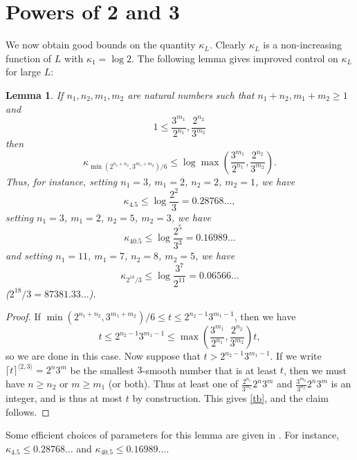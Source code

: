 \documentclass[12pt,a4paper,reqno]{amsart}
\numberwithin{equation}{section}
\theoremstyle{plain}
\newtheorem{lemma}[theorem]{Lemma}
\theoremstyle{definition}
\begin{document}
\section{Powers of 2 and 3}\label{power-sec}

We now obtain good bounds on the quantity $\kappa_L$.  Clearly $\kappa_L$ is a non-increasing function of $L$ with $\kappa_1 = \log 2$.  The following lemma gives improved control on $\kappa_L$ for large $L$:

\begin{lemma}\label{lemcount-0}  If $n_1,n_2,m_1,m_2$ are natural numbers such that $n_1+n_2, m_1+m_2 \geq 1$ and
$$ 1 \leq \frac{3^{m_1}}{2^{n_1}}, \frac{2^{n_2}}{3^{m_2}}$$
then
$$ \kappa_{\min( 2^{n_1+n_2},3^{m_1+m_2})/6} \leq \log \max\left(\frac{3^{m_1}}{2^{n_1}}, \frac{2^{n_2}}{3^{m_2}}\right).$$
Thus, for instance, setting $n_1=3$, $m_1=2$, $n_2=2$, $m_2=1$, we have
$$ \kappa_{4.5} \leq \log \frac{2^2}{3} = 0.28768\dots,$$
setting $n_1 = 3$, $m_1 = 2$, $n_2 = 5$, $m_2 = 3$, we have
$$\kappa_{40.5} \leq \log \frac{2^5}{3^3} = 0.16989\dots$$ 
and setting $n_1 = 11$, $m_1 = 7$, $n_2 = 8$, $m_2 = 5$, we have 
$$\kappa_{2^{18}/3} \leq \log \frac{3^7}{2^{11}} = 0.06566\dots$$
($2^{18}/3 = 87381.33\dots$).
\end{lemma}

\begin{proof}  If $\min( 2^{n_1+n_2},3^{m_1+m_2})/6 \leq t \leq 2^{n_2-1} 3^{m_1-1}$, then we have
\begin{equation}\label{tb} 
  t \leq 2^{n_2-1} 3^{m_1-1} \leq \max\left(\frac{3^{m_1}}{2^{n_1}}, \frac{2^{n_2}}{3^{m_2}}\right) t,
\end{equation}
so we are done in this case.  Now suppose that $t > 2^{n_2-1} 3^{m_1-1}$.
If we write $\lceil t \rceil^{\langle 2,3 \rangle} =2^n 3^m$ be the smallest $3$-smooth number that is at least $t$, then we must have $n \geq n_2$ or $m \geq m_1$ (or both).  Thus at least one of $\frac{2^{n_1}}{3^{m_1}} 2^n 3^m$ and $\frac{3^{m_2}}{3^{n_2}} 2^n 3^m$ is an integer, and is thus at most $t$ by construction.  This gives \eqref{tb}, and the claim follows.
\end{proof}

Some efficient choices of parameters for this lemma are given in .  For instance, $\kappa_{4.5} \leq 0.28768\dots$ and $\kappa_{40.5} \leq 0.16989\dots$.
\end{document}
